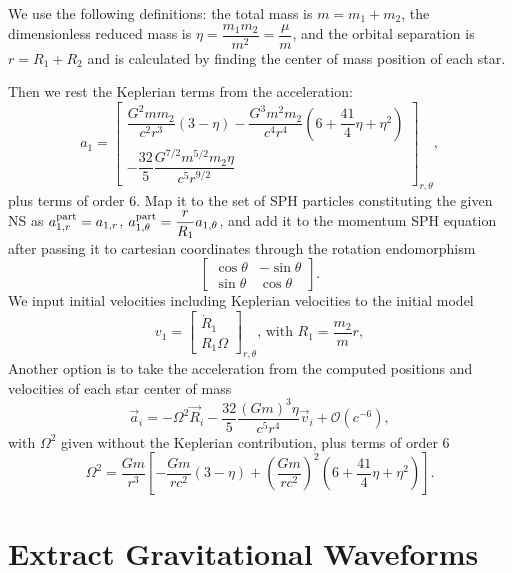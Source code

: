 \documentclass{article}
\newcommand{\paren}[1]{\left(#1\right)}
\newcommand{\Ord}[1]{\mathcal{O}\paren{#1}}
\begin{document}
We use the following definitions:  the total mass is $m=m_1+m_2$, the dimensionless reduced mass is $\eta=\dfrac{m_1m_2}{m^2}=\dfrac{\mu}{m}$, and the orbital separation is $r=R_1+R_2$ and is calculated by finding the center of mass position of each star.

Then we rest the Keplerian terms from the acceleration:
\begin{equation}
  \label{eq:gw:polar:acceleration}
  a_1=\begin{bmatrix}\dfrac{G^2mm_2}{c^2r^3}\left(3-\eta\right)-\dfrac{G^3m^2m_2}{c^4r^4}\left(6+\dfrac{41}{4}\eta+\eta^2\right)\\-\dfrac{32}{5}\dfrac{G^{7/2}m^{5/2}m_2\eta}{c^5r^{9/2}}\end{bmatrix}_{r,\theta} ,
\end{equation}
plus terms of order 6. Map it to the set of SPH particles constituting the given NS as $a_{1,r}^{\rm part}=a_{1,r}$, $a_{1,\theta}^{\rm part}=\dfrac{r}{R_1}a_{1,\theta}$,  and add it to the momentum SPH equation after passing it to cartesian coordinates through the rotation endomorphism
$$\begin{bmatrix}\cos\theta&-\sin\theta\\\sin\theta&\cos\theta\end{bmatrix}.$$
We input initial velocities including Keplerian velocities to the initial model
\begin{equation}
  \label{eq:initial:velocities:matrix}
  v_1=\begin{bmatrix}\dot R_1\\R_1\Omega\end{bmatrix}_{r,\theta}\text{, with }R_1=\dfrac{m_2}{m}r ,
\end{equation}
Another option is to take the acceleration from the computed positions and velocities of each star center of mass
\begin{equation}
  \label{eq:gw:vr:acceleration}
  \vec a_i=-\Omega^2\vec R_i-\dfrac{32}{5}\dfrac{(Gm)^3\eta}{c^5r^4}\vec v_i+\Ord{c^{-6}},
\end{equation}
with $\Omega^2$ given without the Keplerian contribution, plus terms of order 6
$$\Omega^2=\dfrac{Gm}{r^3}\left[-\dfrac{Gm}{rc^2}\left(3-\eta\right)+\left(\dfrac{Gm}{rc^2}\right)^2\left(6+\dfrac{41}{4}\eta+\eta^2\right)\right].$$

\section{Extract Gravitational Waveforms}
\end{document}

